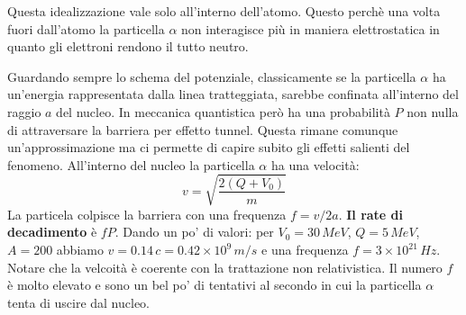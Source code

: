 Questa idealizzazione vale solo all'interno dell'atomo. Questo perchè una volta fuori dall'atomo la particella $\alpha$ non interagisce più in maniera elettrostatica in quanto gli elettroni rendono il tutto neutro.

Guardando sempre lo schema del potenziale, classicamente se la particella $\alpha$ ha un'energia rappresentata dalla linea tratteggiata, sarebbe confinata all'interno del raggio $a$ del nucleo. In meccanica quantistica però ha una probabilità $P$ non nulla di attraversare la barriera per effetto tunnel. Questa rimane comunque un'approssimazione ma ci permette di capire subito gli effetti salienti del fenomeno.  All'interno del nucleo la particella $\alpha$ ha una velocità:
\begin{equation*}
    v=\sqrt{\frac{2(Q+V_0)}{m}}
\end{equation*}
La particela colpisce la barriera con una frequenza $f=v/2a$. \textbf{Il rate di decadimento }è $fP$. Dando un po' di valori: per $V_0=30\,MeV$, $Q=5\,MeV$, $A=200$ abbiamo $v=0.14\,c=0.42\times10^9\,m/s$ e una frequenza $f=3\times10^{21}\,Hz$. Notare che la velcoità è coerente con la trattazione non relativistica. Il numero $f$ è molto elevato e sono un bel po' di tentativi al secondo in cui la particella $\alpha$ tenta di uscire dal nucleo.

